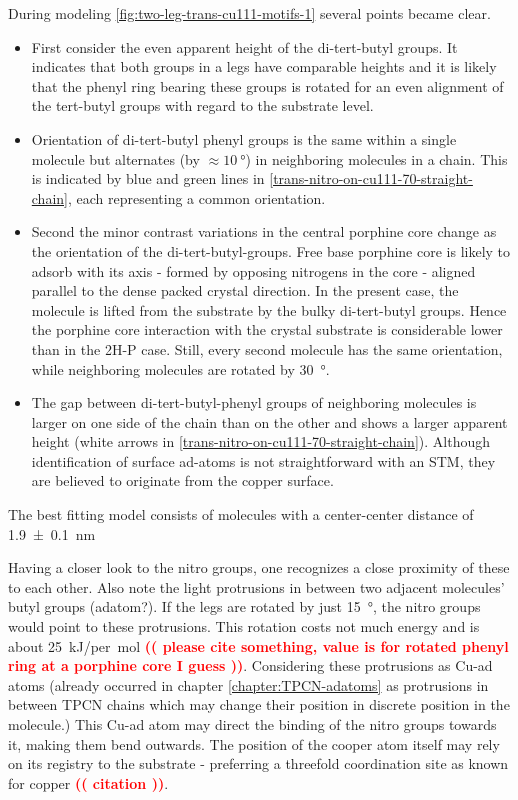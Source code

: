 During modeling \autoref{fig:two-leg-trans-cu111-motifs-1} several points became clear. 
\begin{itemize}
	\item First consider the even apparent height of the di-tert-butyl groups. It indicates that both groups in a legs have comparable heights and it is likely that the phenyl ring bearing these groups is rotated for an even alignment of the tert-butyl groups with regard to the substrate level.
	\item Orientation of di-tert-butyl phenyl groups is the same within a single molecule but alternates (by $\approx \SI{10}{\degree}$) in neighboring molecules in a chain. This is indicated by blue and green lines in \autoref{trans-nitro-on-cu111-70-straight-chain}, each representing a common orientation.
	\item Second the minor contrast variations in the central porphine core change as the orientation of the di-tert-butyl-groups. Free base porphine core is likely to adsorb with its axis  - formed by opposing nitrogens in the core - aligned parallel to the dense packed crystal direction\cite{rojas_surface_2012}. In the present case, the molecule is lifted from the substrate by the bulky di-tert-butyl groups. Hence the porphine core interaction with the crystal substrate is considerable lower than in the 2H-P case. Still, every second molecule has the same orientation, while neighboring molecules are rotated by \SI{30}{\degree}.
	\item The gap between di-tert-butyl-phenyl groups of neighboring molecules is larger on one side of the chain than on the other and shows a larger apparent height (white arrows in \autoref{trans-nitro-on-cu111-70-straight-chain}). Although identification of surface ad-atoms is not straightforward with an STM, they are believed to originate from the copper surface.
\end{itemize} 
The best fitting model consists of molecules with a center-center distance of \SI{1.9 \pm 0.1}{\nano \meter}

Having a closer look to the nitro groups, one recognizes a close proximity of these to each other. Also note the light protrusions in between two adjacent molecules' butyl groups (adatom?). If the legs are rotated by just \SI{15}{\degree}, the nitro groups would point to these protrusions. This rotation costs not much energy and is about \SI{25}{\kilo\J/per\mol} \textcolor{red}{\textbf{(( please cite something, value is for rotated phenyl ring at a porphine core I guess ))}}. Considering these protrusions as Cu-ad atoms (already occurred in chapter \ref{chapter:TPCN-adatoms} as protrusions in between TPCN chains which may change their position in discrete position in the molecule.) This Cu-ad atom may direct the binding of the nitro groups towards it, making them bend outwards. The position of the cooper atom itself may rely on its registry to the substrate - preferring a threefold coordination site as known for copper  \textcolor{red}{\textbf{(( citation ))}}.

